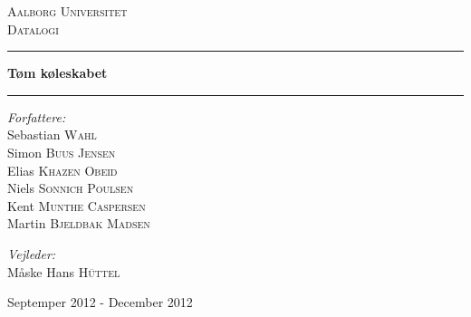 \begin{titlingpage}
\centering
\vspace*{1.0cm}

\textsc{\LARGE Aalborg Universitet}\\[0.75cm]
\textsc{\Large Datalogi}\\[1.75cm]

\hrule
{ \huge \bfseries Tøm køleskabet}
\vspace{0.5cm}
\hrule
\vspace{0.75cm}

  \begin{flushleft} \large
    \vspace{0pt}
    \emph{Forfattere:}\\
    Sebastian \textsc{Wahl}\\
    Simon \textsc{Buus Jensen}\\
    Elias \textsc{Khazen Obeid}\\
    Niels \textsc{Sonnich Poulsen}\\
    Kent \textsc{Munthe Caspersen}\\
    Martin \textsc{Bjeldbak Madsen}\\
  \end{flushleft}

  \begin{flushright} \large
  \vspace{-132pt}
  \emph{Vejleder:}\\
  Måske Hans \textsc{H\"{u}ttel}
  \end{flushright}


\vfill

{\large Septemper 2012 - December 2012}

\end{titlingpage}
